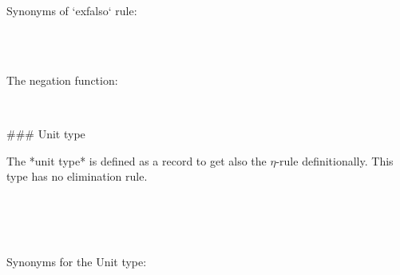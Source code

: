 Synonyms of `exfalso` rule:

\begin{code}%
\>[0]\AgdaSpace{}%
\AgdaSymbol{=}\AgdaSpace{}%
\<%
\\
\>[0]%
\>[11]\AgdaSymbol{=}\AgdaSpace{}%
\<%
\\
\>[0]%
\>[11]\AgdaSymbol{=}\AgdaSpace{}%
\<%
\end{code}

The negation function:
\begin{code}%
\>[0]\AgdaSpace{}%
\AgdaSymbol{:}\AgdaSpace{}%
\AgdaSpace{}%
\AgdaSymbol{\{}\AgdaSymbol{\}}\AgdaSpace{}%
\AgdaSpace{}%
\AgdaSpace{}%
\AgdaSpace{}%
\AgdaSpace{}%
\AgdaSpace{}%
\<%
\\
\>[0]\AgdaSpace{}%
\AgdaSpace{}%
\AgdaSymbol{=}\AgdaSpace{}%
\AgdaSymbol{(}\AgdaSpace{}%
\AgdaSpace{}%
\AgdaSpace{}%
\AgdaSymbol{\{}\AgdaSymbol{\})}\<%
\end{code}

### Unit type

The *unit type* is defined as a record to get also the $η$-rule
definitionally. This type has no elimination rule.

\begin{code}%
\>[0]\AgdaSpace{}%
\AgdaSpace{}%
\AgdaSymbol{\{}\AgdaSymbol{\}}\AgdaSpace{}%
\AgdaSymbol{:}\AgdaSpace{}%
\AgdaSpace{}%
\AgdaSpace{}%
\<%
\\
\>[0][@{}l@{\AgdaIndent{0}}]%
\>[2]\AgdaSpace{}%
\<%
\\
%
\\[\AgdaEmptyExtraSkip]%
\>[0]\AgdaSymbol{\{-\#}\AgdaSpace{}%
\AgdaSpace{}%
\AgdaSpace{}%
\AgdaSpace{}%
\AgdaSymbol{\#-\}}\<%
\end{code}

Synonyms for the Unit type:
\begin{code}%
\>[0]\AgdaSpace{}%
\AgdaSymbol{=}\AgdaSpace{}%
\<%
\\
\>[0]%
\>[5]\AgdaSymbol{=}\AgdaSpace{}%
\<%
\end{code}

